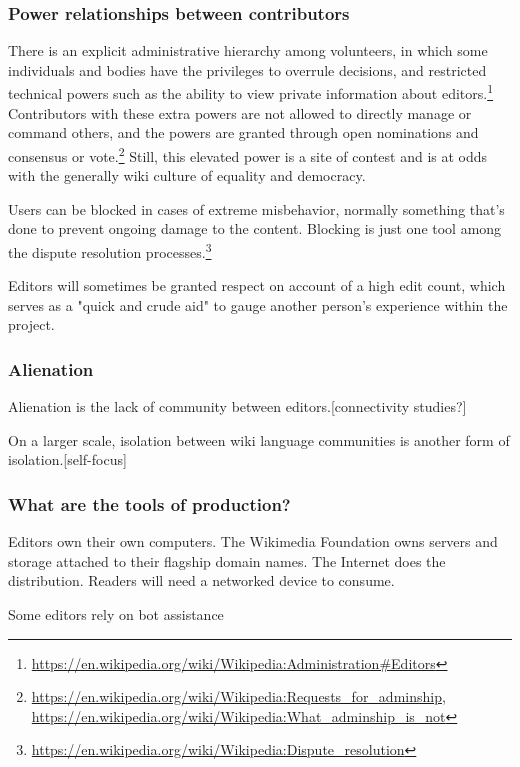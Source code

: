 \documentclass[format=sigconf, authorversion]{acmart}
\begin{document}
\subsubsection{Power relationships between contributors}

There is an explicit administrative hierarchy among volunteers, in which some individuals and bodies have the privileges to overrule decisions, and restricted technical powers such as the ability to view private information about editors.\footnote{\url{https://en.wikipedia.org/wiki/Wikipedia:Administration\#Editors}}  Contributors with these extra powers are not allowed to directly manage or command others, and the powers are granted through open nominations and consensus or vote.\footnote{\url{https://en.wikipedia.org/wiki/Wikipedia:Requests_for_adminship}, \url{https://en.wikipedia.org/wiki/Wikipedia:What_adminship_is_not}}  Still, this elevated power is a site of contest and is at odds with the generally wiki culture of equality and democracy.

Users can be blocked in cases of extreme misbehavior, normally something that's done to prevent ongoing damage to the content.  Blocking is just one tool among the dispute resolution processes.\footnote{\url{https://en.wikipedia.org/wiki/Wikipedia:Dispute_resolution}}

Editors will sometimes be granted respect on account of a high edit count, which serves as a "quick and crude aid" to gauge another person's experience within the project.

\subsubsection{Alienation}

Alienation is the lack of community between editors.[connectivity studies?]

On a larger scale, isolation between wiki language communities is another form of isolation.[self-focus]

\subsubsection{What are the tools of production?}

Editors own their own computers.  The Wikimedia Foundation owns servers and storage attached to their flagship domain names.  The Internet does the distribution.  Readers will need a networked device to consume.

Some editors rely on bot assistance
\end{document}
